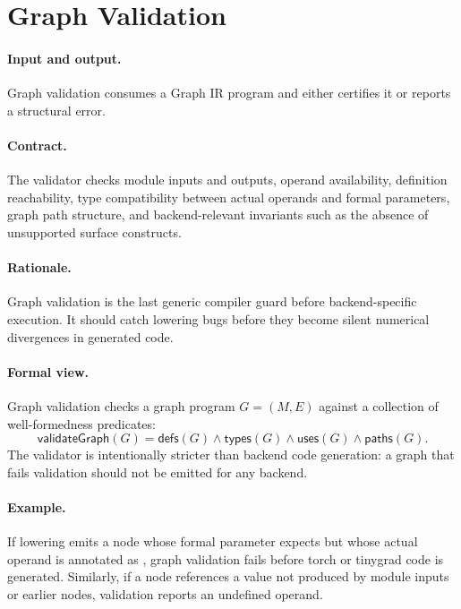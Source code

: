 \section{Graph Validation}

\paragraph{Input and output.}
Graph validation consumes a Graph IR program and either certifies it or reports
a structural error.

\paragraph{Contract.}
The validator checks module inputs and outputs, operand availability,
definition reachability, type compatibility between actual operands and formal
parameters, graph path structure, and backend-relevant invariants such as the
absence of unsupported surface constructs.

\paragraph{Rationale.}
Graph validation is the last generic compiler guard before backend-specific
execution.  It should catch lowering bugs before they become silent numerical
divergences in generated code.

\paragraph{Formal view.}
Graph validation checks a graph program \(G=(M,E)\) against a collection of
well-formedness predicates:
\[
  \mathsf{validateGraph}(G) =
  \mathsf{defs}(G) \land \mathsf{types}(G) \land \mathsf{uses}(G)
  \land \mathsf{paths}(G).
\]
The validator is intentionally stricter than backend code generation: a graph
that fails validation should not be emitted for any backend.

\paragraph{Example.}
If lowering emits a node whose formal parameter expects 
but whose actual operand is annotated as , graph validation fails
before torch or tinygrad code is generated.  Similarly, if a node references a
value not produced by module inputs or earlier nodes, validation reports an
undefined operand.

